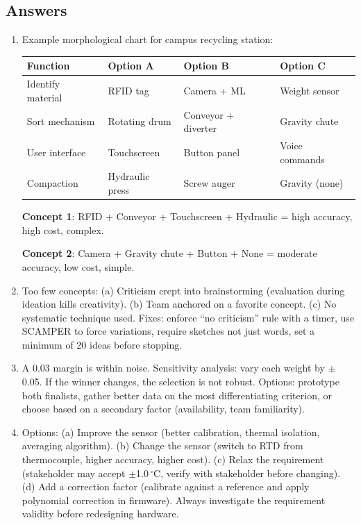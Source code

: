 \documentclass[11pt,letterpaper,twoside,openany]{book}
\newcommand{\degC}{\ensuremath{{}^{\circ}\text{C}}}
\begin{document}
\subsection{Answers}
\begin{enumerate}[leftmargin=1.5em]
\item Example morphological chart for campus recycling station:

\small
\begin{tabularx}{\textwidth}{l X X X}
\toprule
Function & Option A & Option B & Option C \\
\midrule
Identify material & RFID tag & Camera + ML & Weight sensor \\
Sort mechanism & Rotating drum & Conveyor + diverter & Gravity chute \\
User interface & Touchscreen & Button panel & Voice commands \\
Compaction & Hydraulic press & Screw auger & Gravity (none) \\
\bottomrule
\end{tabularx}
\normalsize

\textbf{Concept 1}: RFID + Conveyor + Touchscreen + Hydraulic = high accuracy, high cost, complex.

\textbf{Concept 2}: Camera + Gravity chute + Button + None = moderate accuracy, low cost, simple.

\item Too few concepts: (a) Criticism crept into brainstorming (evaluation during ideation kills creativity). (b) Team anchored on a favorite concept. (c) No systematic technique used. Fixes: enforce ``no criticism'' rule with a timer, use SCAMPER to force variations, require sketches not just words, set a minimum of 20 ideas before stopping.

\item A 0.03 margin is within noise. Sensitivity analysis: vary each weight by $\pm$0.05. If the winner changes, the selection is not robust. Options: prototype both finalists, gather better data on the most differentiating criterion, or choose based on a secondary factor (availability, team familiarity).

\item Options: (a) Improve the sensor (better calibration, thermal isolation, averaging algorithm). (b) Change the sensor (switch to RTD from thermocouple, higher accuracy, higher cost). (c) Relax the requirement (stakeholder may accept $\pm$1.0\,\degC{}, verify with stakeholder before changing). (d) Add a correction factor (calibrate against a reference and apply polynomial correction in firmware). Always investigate the requirement validity before redesigning hardware.


\end{enumerate}
\end{document}
